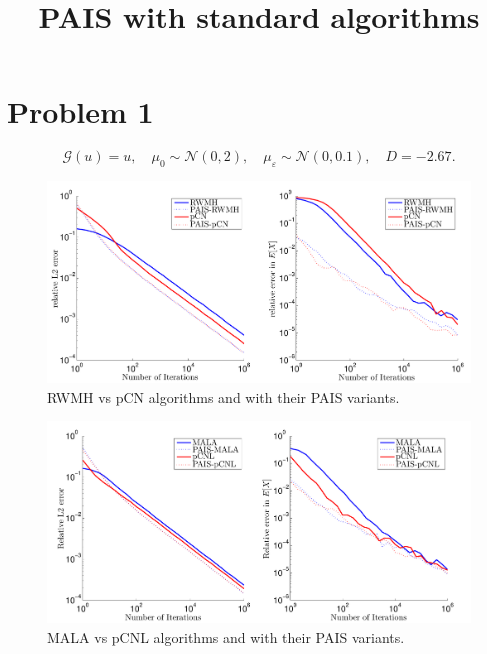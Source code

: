 \documentclass{article}
\title{PAIS with standard algorithms}
\begin{document}
\thispagestyle{fancy}
\maketitle

\section{Problem 1}
\[
	\mathcal{G}(u) = u, \quad \mu_0 \sim \mathcal{N}(0, 2), \quad \mu_\varepsilon \sim \mathcal{N}(0, 0.1), \quad D = -2.67.
\]
\begin{figure}[h]
\begin{center}
\includegraphics[width=\textwidth]{figures/RWMH1-pCN1}
\end{center}
\caption{RWMH vs pCN algorithms and with their PAIS variants.}
\label{fig:RWMH1}
\end{figure}
\begin{figure}[h]
\begin{center}
\includegraphics[width=\textwidth]{figures/MALA1-pCNL1}
\end{center}
\caption{MALA vs pCNL algorithms and with their PAIS variants.}
\label{fig:MALA1}
\end{figure}

\FloatBarrier\newpage
\end{document}
